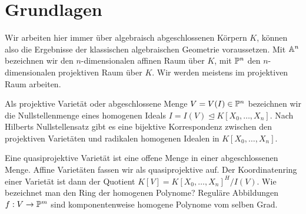 \chapter{Grundlagen} \label{chap:prelim}
Wir arbeiten hier immer über algebraisch abgeschlossenen Körpern $K$, können also die Ergebnisse der klassischen algebraischen Geometrie voraussetzen. Mit $\mathbb A^{n}$ bezeichnen wir den $n$-dimensionalen affinen Raum über $K$, mit $\mathbb P^{n}$ den $n$-dimensionalen projektiven Raum über $K$. Wir werden meistens im projektiven Raum arbeiten.

Als projektive Varietät oder abgeschlossene Menge $V = V(I) \in \mathbb P^{n}$ bezeichnen wir die Nullstellenmenge eines homogenen Ideals $I = I(V) \unlhd K[X_0,\dots,X_n]$. Nach Hilberts Nullstellensatz gibt es eine bijektive Korrespondenz zwischen den projektiven Varietäten und radikalen homogenen Idealen in $K[X_0,\dots,X_n]$.

Eine quasiprojektive Varietät ist eine offene Menge in einer abgeschlossenen Menge. Affine Varietäten fassen wir als quasiprojektive auf. Der Koordinatenring einer Varietät ist dann der Quotient $K[V] = K[X_0,\dots,X_n]^H/I(V)$. \note Wie bezeichnet man den Ring der homogenen Polynome? Reguläre Abbildungen $f: V \rightarrow \mathbb P^{m}$ sind komponentenweise homogene Polynome vom selben Grad.




